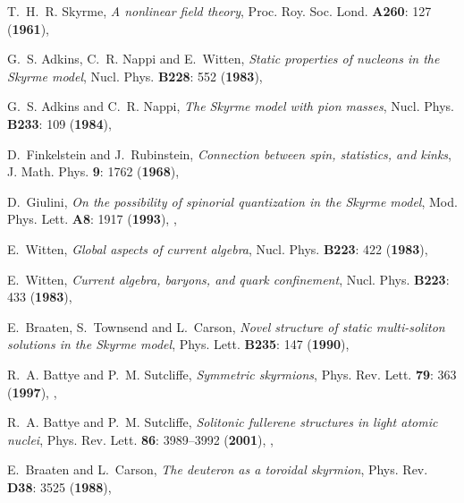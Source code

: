\documentclass[a4paper,12pt]{article}
\begin{document}
\renewcommand{\baselinestretch}{1}
\begin{small}

\begin{thebibliography}{10}

T.~H.~R. Skyrme, {\em A nonlinear field theory\/}, Proc. Roy. Soc. Lond. {\bf
  A260}: 127 ({\bf 1961}),

G.~S. Adkins, C.~R. Nappi and E.~Witten, {\em Static properties of nucleons in
  the {S}kyrme model\/}, Nucl. Phys. {\bf B228}: 552 ({\bf 1983}),

G.~S. Adkins and C.~R. Nappi, {\em The {S}kyrme model with pion masses\/},
  Nucl. Phys. {\bf B233}: 109 ({\bf 1984}),

D.~Finkelstein and J.~Rubinstein, {\em Connection between spin, statistics, and
  kinks\/}, J. Math. Phys. {\bf 9}: 1762 ({\bf 1968}),

D.~Giulini, {\em On the possibility of spinorial quantization in the {S}kyrme
  model\/}, Mod. Phys. Lett. {\bf A8}: 1917 ({\bf 1993}),
  {},

E.~Witten, {\em Global aspects of current algebra\/}, Nucl. Phys. {\bf B223}:
  422 ({\bf 1983}),

E.~Witten, {\em Current algebra, baryons, and quark confinement\/}, Nucl. Phys.
  {\bf B223}: 433 ({\bf 1983}),

E.~Braaten, S.~Townsend and L.~Carson, {\em Novel structure of static
  multi-soliton solutions in the {S}kyrme model\/}, Phys. Lett. {\bf B235}: 147
  ({\bf 1990}),

R.~A. Battye and P.~M. Sutcliffe, {\em Symmetric skyrmions\/}, Phys. Rev. Lett.
  {\bf 79}: 363 ({\bf 1997}), {},

R.~A. Battye and P.~M. Sutcliffe, {\em Solitonic fullerene structures in light
  atomic nuclei\/}, Phys. Rev. Lett. {\bf 86}: 3989--3992 ({\bf 2001}),
  {},

E.~Braaten and L.~Carson, {\em The deuteron as a toroidal skyrmion\/}, Phys.
  Rev. {\bf D38}: 3525 ({\bf 1988}),


\end{thebibliography}
\end{small}
\end{document}
